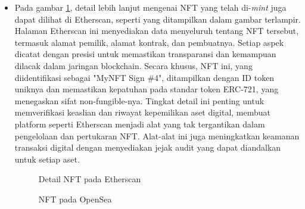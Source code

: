\begin{itemize}
    \item Pada gambar \ref*{fig:detail_nft_etherscan}, detail lebih lanjut mengenai NFT yang telah di-\emph{mint} juga dapat dilihat di Etherscan, seperti yang ditampilkan dalam gambar terlampir. Halaman Etherscan ini menyediakan data menyeluruh tentang NFT tersebut, termasuk alamat pemilik, alamat kontrak, dan pembuatnya. Setiap aspek dicatat dengan presisi untuk memastikan transparansi dan kemampuan dilacak dalam jaringan blockchain. Secara khusus, NFT ini, yang diidentifikasi sebagai "MyNFT Sign \#4", ditampilkan dengan ID token uniknya dan memastikan kepatuhan pada standar token ERC-721, yang menegaskan sifat non-fungible-nya. Tingkat detail ini penting untuk memverifikasi keaslian dan riwayat kepemilikan aset digital, membuat platform seperti Etherscan menjadi alat yang tak tergantikan dalam pengelolaan dan pertukaran NFT. Alat-alat ini juga meningkatkan keamanan transaksi digital dengan menyediakan jejak audit yang dapat diandalkan untuk setiap aset.

    \begin{figure} [H] \centering
    \caption{Detail NFT pada Etherscan}
    \label{fig:detail_nft_etherscan}
    \end{figure}
    
    \begin{figure} [H] \centering
    \caption{NFT pada OpenSea}
    \label{fig:nft_opensea}
    \end{figure}


\end{itemize}
